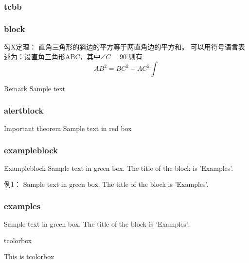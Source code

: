 \begin{frame}
  \frametitle{tcbb}
  \centering
\end{frame}

\begin{frame}\frametitle{block}
	\begin{block}{勾X定理：}
		直角三角形的斜边的平方等于两直角边的平方和。
		可以用符号语言表述为：设直角三角形ABC，其中$\angle C=90^\circ $则有
		\begin{equation}
			AB^2=BC^2+AC^2 \int
		\end{equation}
	\end{block}
	\begin{block}{Remark}
		Sample text
	\end{block}
\end{frame}

\begin{frame}
    \frametitle{alertblock}
	\begin{alertblock}{Important theorem}
		Sample text in red box
	\end{alertblock}
\end{frame}

\begin{frame}
    \frametitle{exampleblock}
	\begin{exampleblock} {Exampleblock}
		Sample text in green box. The title of the block is 'Examples'.
	\end{exampleblock}
    \begin{exampleblock} {例1：}
		Sample text in green box. The title of the block is 'Examples'.
	\end{exampleblock}
\end{frame}

\begin{frame}
    \frametitle{examples}
	\begin{examples}
		Sample text in green box. The title of the block is 'Examples'.
	\end{examples}
\end{frame}

\begin{frame}{tcolorbox}
  \begin{tcolorbox}[title=5.tcolorbox,colframe=red!75!black]
    This is tcolorbox
  \end{tcolorbox}
\end{frame}

